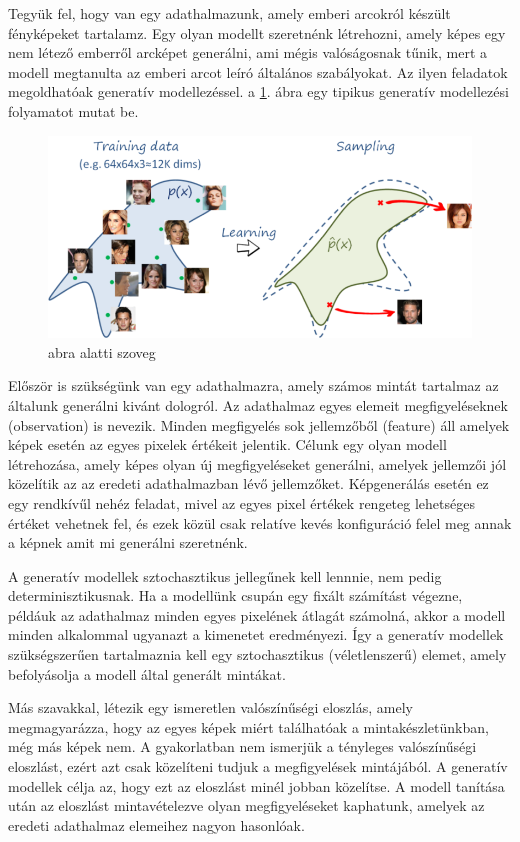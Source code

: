Tegyük fel, hogy van egy adathalmazunk, amely emberi arcokról készült fényképeket tartalamz. Egy olyan modellt szeretnénk létrehozni, amely képes egy nem létező emberről arcképet generálni, ami mégis valóságosnak tűnik, mert a modell megtanulta az emberi arcot leíró általános szabályokat. Az ilyen feladatok megoldhatóak generatív modellezéssel. a \ref{fig:generative_model}. ábra egy tipikus generatív modellezési folyamatot mutat be.

\begin{figure}[h]
	\centering
	\includegraphics[width=0.9\columnwidth]{figures/generative_model_struct.png}
	\caption{abra alatti szoveg}
	\label{fig:generative_model}
\end{figure}

Először is szükségünk van egy adathalmazra, amely számos mintát tartalmaz az általunk generálni kivánt dologról. Az adathalmaz egyes elemeit megfigyeléseknek (observation) is nevezik. Minden megfigyelés sok jellemzőből (feature) áll amelyek képek esetén az egyes pixelek értékeit jelentik. Célunk egy olyan modell létrehozása, amely képes olyan új megfigyeléseket generálni, amelyek jellemzői jól közelítik az az eredeti adathalmazban lévő jellemzőket. Képgenerálás esetén ez egy rendkívűl nehéz feladat, mivel az egyes pixel értékek rengeteg lehetséges értéket vehetnek fel, és ezek közül csak relatíve kevés konfiguráció felel meg annak a képnek amit mi generálni szeretnénk.

A generatív modellek sztochasztikus jellegűnek kell lennnie, nem pedig determinisztikusnak. Ha a modellünk csupán egy fixált számítást végezne, példáuk az adathalmaz minden egyes pixelének átlagát számolná, akkor a modell minden alkalommal ugyanazt a kimenetet eredményezi. Így a generatív modellek szükségszerűen tartalmaznia kell egy sztochasztikus (véletlenszerű) elemet, amely befolyásolja a modell által generált mintákat.

Más szavakkal, létezik egy ismeretlen valószínűségi eloszlás, amely megmagyarázza, hogy az egyes képek miért találhatóak a mintakészletünkban, még más képek nem. A gyakorlatban nem ismerjük a tényleges valószínűségi eloszlást, ezért azt csak közelíteni tudjuk a megfigyelések mintájából. A generatív modellek célja az, hogy ezt az eloszlást minél jobban közelítse. A modell tanítása után az eloszlást mintavételezve olyan megfigyeléseket kaphatunk, amelyek az eredeti adathalmaz elemeihez nagyon hasonlóak.

